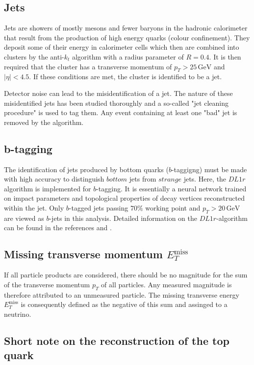 \subsection{Jets}
\label{sec:jets}
Jets are showers of mostly mesons and fewer baryons in the hadronic calorimeter that result from the production of high energy quarks (colour confinement). They deposit some of their energy in calorimeter cells which then are combined into clusters by the anti-$k_t$ algorithm \cite{anti_k_t} with a radius parameter of $R = 0.4$. 
It is then required that the cluster has a transverse momentum of $p_T > 25 \,\si{\giga\electronvolt}$ and $\bigl|\eta\bigr| < 4.5$. If these conditions are met, the cluster is identified to be a jet.

Detector noise can lead to the misidentification of a jet. The nature of these misidentified jets has been studied thoroughly and a so-called "jet cleaning procedure" is used to tag them. 
Any event containing at least one "bad" jet is removed by the algorithm. 
\subsection{b-tagging}
\label{sec:btagging}

The identification of jets produced by bottom quarks ($b$-taggigng) must be made with high accuracy to distinguish $bottom$ jets from $strange$ jets. Here, the $DL1r$ algorithm is implemented for $b$-tagging. It is essentially a neural network trained 
on impact parameters and topological properties of decay vertices reconstructed within the jet. Only $b$-tagged jets passing $70\%$ working point and $p_T >20 \,\si{\giga\electronvolt}$ are viewed as $b$-jets in this analysis. 
Detailed information on the $DL1r$-algorithm can be found in the references \cite{btag1} and \cite{btag2}.

\subsection{Missing transverse momentum \texorpdfstring{$E_T^{\text{miss}}$}{}}

If all particle products are considered, there should be no magnitude for the sum of the transverse momentum $p_T$ of all particles. 
Any measured magnitude is therefore attributed to an unmeasured particle. The missing transverse energy $E_T^{\text{miss}}$ is consequently defined as the negative of this sum and assinged to a neutrino. 

\subsection{Short note on the reconstruction of the top quark}

